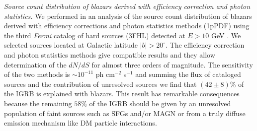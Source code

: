 \documentclass[12 pt]{article}
\newcommand{\FIXME}[1]{{\color{red}{\em Comment: }{#1}}}
\begin{document}




{\it Source count distribution of blazars derived with efficiency correction and photon statistics.}
We performed in \cite{DiMauro:2017ing} an analysis of the source count distribution of blazars derived with efficiency corrections and photon statistics methods (1pPDF) using the third {\it Fermi} catalog of hard sources (3FHL) detected at $E>10$ GeV \cite{TheFermi-LAT:2017pvy}. We selected sources located at Galactic latitude $|b|>20^{\circ}$.
The efficiency correction and photon statistics methods give compatible results and they allow determination of the $dN/dS$ for almost three orders of magnitude. The sensitivity of the two methods is $\sim 10^{-11}$ ph cm$^{-2}$ s$^{-1}$ and summing the flux of cataloged sources and the contribution of unresolved sources we find that $(42\pm8)\%$ of the IGRB is explained with blazars.
This result has remarkable consequences because the remaining $58\%$ of the IGRB should be given by an unresolved population of faint sources such as SFGs and/or MAGN or from a truly diffuse emission mechanism like DM particle interactions. 
\end{document}
